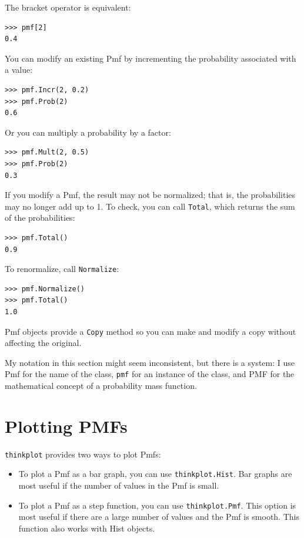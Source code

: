 \documentclass[12pt]{book}
\begin{document}
The bracket operator is equivalent:

\begin{verbatim}
>>> pmf[2]
0.4
\end{verbatim}

You can modify an existing Pmf by incrementing the probability
associated with a value:
%
\begin{verbatim}
>>> pmf.Incr(2, 0.2)
>>> pmf.Prob(2)
0.6
\end{verbatim}

Or you can multiply a probability by a factor:
%
\begin{verbatim}
>>> pmf.Mult(2, 0.5)
>>> pmf.Prob(2)
0.3
\end{verbatim}

If you modify a Pmf, the result may not be normalized; that is, the
probabilities may no longer add up to 1.  To check, you can call \verb"Total",
which returns the sum of the probabilities:
%
\begin{verbatim}
>>> pmf.Total()
0.9
\end{verbatim}

To renormalize, call \verb"Normalize":
%
\begin{verbatim}
>>> pmf.Normalize()
>>> pmf.Total()
1.0
\end{verbatim}

Pmf objects provide a \verb"Copy" method so you can make
and modify a copy without affecting the original.

My notation in this section might seem inconsistent, but there is a
system: I use Pmf for the name of the class, \verb"pmf" for an instance
of the class, and PMF for the mathematical concept of a
probability mass function.


\section{Plotting PMFs}

\verb"thinkplot" provides two ways to plot Pmfs:

\begin{itemize}

\item To plot a Pmf as a bar graph, you can use 
\verb"thinkplot.Hist".  Bar graphs are most useful if the number
of values in the Pmf is small.

\item To plot a Pmf as a step function, you can use
\verb"thinkplot.Pmf".  This option is most useful if there are
a large number of values and the Pmf is smooth.  This function
also works with Hist objects.

\end{itemize}
\end{document}

